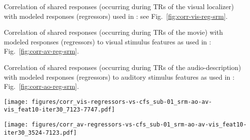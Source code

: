 %
Correlation of shared responses (occurring during TRs of the visual localizer)
with modeled responses (regressors) used in \citet{sengupta2016extension}: see
Fig.~\ref{fig:corr-vis-reg-srm}.

%
Correlation of shared responses (occurring during TRs of the movie) with modeled
responses (regressors) to visual stimulus features as used in
\citet{haeusler2022processing}: Fig.~\ref{fig:corr-av-reg-srm}.

%
Correlation of shared responses (occurring during TRs of the audio-description)
with modeled responses (regressors) to auditory stimulus features as used in
\citet{haeusler2022processing}: Fig.~\ref{fig:corr-ao-reg-srm}.



\begin{figure*}[tbp]
\centering
\texttt{[image: figures/corr\_vis-regressors-vs-cfs\_sub-01\_srm-ao-av-vis\_feat10-iter30\_7123-7747.pdf]}
    \caption{
    \textbf{Correlations of shared responses and regressors of the visual
    localizer.
    }
    Pearson correlation coefficients between a) shared responses (sh. res.)
    within the \ac{cfs} that was calculated for subject 01 and b) regressors
    created in \citet{sengupta2016extension} to model hemodynamic responses
    during the six-category visual localizer paradigm.
    The time series of the \ac{cfs} were sliced to match the TRs of the
    visual localizer.
    }
    \label{fig:corr-vis-reg-srm}
\end{figure*}


\begin{figure*}[tbp]
\centering
    \texttt{[image: figures/corr\_av-regressors-vs-cfs\_sub-01\_srm-ao-av-vis\_feat10-iter30\_3524-7123.pdf]}
    \caption{
    \textbf{Correlations of shared responses and regressors of the movie.}
    Pearson correlation coefficients between a) shared responses (sh. res.)
    within the \ac{cfs} that was calculated for subject 01 and b) regressors
    created in \citet{haeusler2022processing} to model hemodynamic responses to
    stimulus features of the movie.
    The time series of the \ac{cfs} were sliced to match the TRs of the
    movie.
    }
    \label{fig:corr-av-reg-srm}
\end{figure*}



